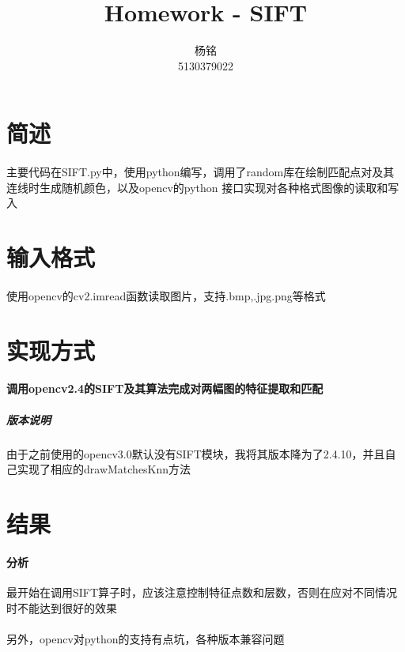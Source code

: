 \documentclass{article}
\author{杨铭\\5130379022}
\title{Homework - SIFT}
\begin{document}
    \maketitle
    \section{简述}
        \paragraph{}主要代码在SIFT.py中，使用python编写，调用了random库在绘制匹配点对及其连线时生成随机颜色，以及opencv的python
    接口实现对各种格式图像的读取和写入
    \section{输入格式}
        \paragraph{}使用opencv的cv2.imread函数读取图片，支持.bmp,.jpg.png等格式
    \section{实现方式}
        \paragraph{调用opencv2.4的SIFT及其算法完成对两幅图的特征提取和匹配}
            \subparagraph{版本说明}由于之前使用的opencv3.0默认没有SIFT模块，我将其版本降为了2.4.10，并且自己实现了相应的drawMatchesKnn方法
        \section{结果}
        \paragraph{分析}最开始在调用SIFT算子时，应该注意控制特征点数和层数，否则在应对不同情况时不能达到很好的效果
        \paragraph{}另外，opencv对python的支持有点坑，各种版本兼容问题
\end{document}
